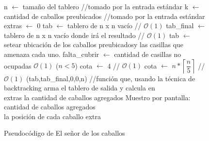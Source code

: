 \begin{figure}
\begin{codebox}
\li n $\leftarrow$ tamaño del tablero //tomado por la entrada estándar
\li k $\leftarrow$ cantidad de caballos preubicados //tomado por la entrada estándar
\li extras $\leftarrow$ 0
\li tab $\leftarrow$ tablero de n x n vacío // $\mathcal{O}(1)$
\li tab_final $\leftarrow$ tablero de n x n vacío donde irá el resultado // $\mathcal{O}(1)$
\li tab $\leftarrow$ setear ubicación de los caballos preubicadosy las casillas que amenaza cada uno.
\li falta_cubrir $\leftarrow$ cantidad de casillas no ocupadas $\mathcal{O}(1)$
\li \If ($n < 5$)
\li \quad cota $\leftarrow$ 4  // $\mathcal{O}(1)$
\li \Else
\li \quad cota $\leftarrow$ $n*\left \lceil \dfrac{n}{5} \right \rceil$   // $\mathcal{O}(1)$
(tab,tab_final,0,0,n)
\li //función que, usando la técnica de backtracking arma el tablero de salida y calcula en\\ extras la cantidad de caballos agregados
\li Muestro por pantalla: cantidad de caballos agregados\\la posición de cada caballo extra
\end{codebox}
\caption{Pseudocódigo de El señor de los caballos}\label{code:caballos}
\end{figure}
\FloatBarrier


